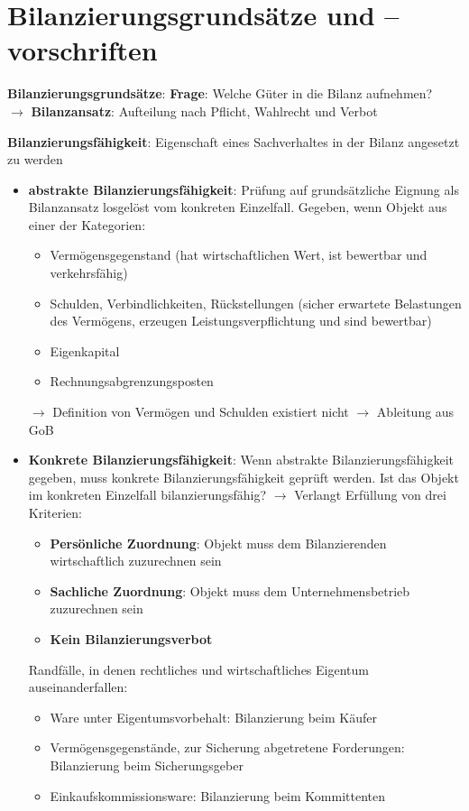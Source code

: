 \section{Bilanzierungsgrundsätze und –vorschriften}

\textbf{Bilanzierungsgrundsätze}: \textbf{Frage}: Welche Güter in die Bilanz aufnehmen?\\
$\rightarrow$ \textbf{Bilanzansatz}: Aufteilung nach Pflicht, Wahlrecht und Verbot

\textbf{Bilanzierungsfähigkeit}: Eigenschaft eines Sachverhaltes in der Bilanz angesetzt zu werden
\begin{itemize}
	\item \textbf{abstrakte Bilanzierungsfähigkeit}: Prüfung auf grundsätzliche Eignung als Bilanzansatz losgelöst vom konkreten Einzelfall. Gegeben, wenn Objekt aus einer der Kategorien:
	\begin{itemize}
		\item Vermögensgegenstand (hat wirtschaftlichen Wert, ist bewertbar und verkehrsfähig)
		\item Schulden, Verbindlichkeiten, Rückstellungen (sicher erwartete Belastungen des Vermögens, erzeugen Leistungsverpflichtung und sind bewertbar)
		\item Eigenkapital
		\item Rechnungsabgrenzungsposten
	\end{itemize}
	$\rightarrow$ Definition von Vermögen und Schulden existiert nicht $\rightarrow$ Ableitung aus GoB
	\item \textbf{Konkrete Bilanzierungsfähigkeit}: Wenn abstrakte Bilanzierungsfähigkeit gegeben, muss
	konkrete Bilanzierungsfähigkeit geprüft werden. Ist das Objekt im konkreten Einzelfall bilanzierungsfähig? $\rightarrow$ Verlangt Erfüllung von drei Kriterien:
	\begin{itemize}
		\item \textbf{Persönliche Zuordnung}: Objekt muss dem Bilanzierenden wirtschaftlich zuzurechnen sein
		\item \textbf{Sachliche Zuordnung}: Objekt muss dem Unternehmensbetrieb zuzurechnen sein 
		\item \textbf{Kein Bilanzierungsverbot}
	\end{itemize}
	Randfälle, in denen rechtliches und wirtschaftliches Eigentum auseinanderfallen: 
	\begin{itemize}
		\item Ware unter Eigentumsvorbehalt: Bilanzierung beim Käufer
		\item Vermögensgegenstände, zur Sicherung abgetretene Forderungen: Bilanzierung beim Sicherungsgeber
		\item Einkaufskommissionsware: Bilanzierung beim Kommittenten
	\end{itemize}
\end{itemize}
